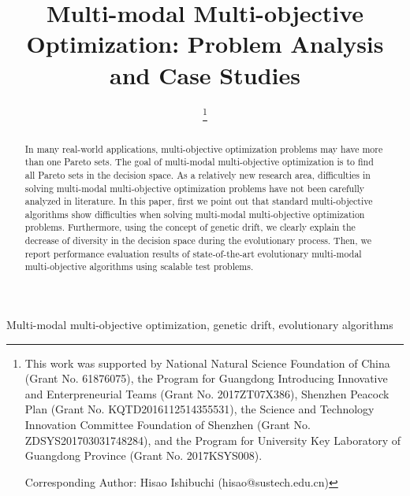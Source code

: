 \documentclass[conference]{IEEEtran}
\begin{document}
\title{Multi-modal Multi-objective Optimization: Problem Analysis and Case Studies
}
\author{
\thanks{This work was supported by National Natural Science Foundation of China (Grant No. 61876075), the Program for Guangdong Introducing Innovative and Enterpreneurial Teams (Grant No. 2017ZT07X386), Shenzhen Peacock Plan (Grant No. KQTD2016112514355531), the Science and Technology Innovation Committee Foundation of Shenzhen (Grant No. ZDSYS201703031748284), and the Program for University Key Laboratory of Guangdong Province (Grant No. 2017KSYS008).

Corresponding Author: Hisao Ishibuchi (hisao@sustech.edu.cn)
}
}

\maketitle

\begin{abstract}
In many real-world applications, multi-objective optimization problems may have more than one Pareto sets. The goal of multi-modal multi-objective optimization is to find all Pareto sets in the decision space. As a relatively new research area, difficulties in solving multi-modal multi-objective optimization problems have not been carefully analyzed in literature. In this paper, first we point out that standard multi-objective algorithms show difficulties when solving multi-modal multi-objective optimization problems. Furthermore, using the concept of genetic drift, we clearly explain the decrease of diversity in the decision space during the evolutionary process. Then, we report performance evaluation results of state-of-the-art evolutionary multi-modal multi-objective algorithms using scalable test problems.
\end{abstract}

\begin{IEEEkeywords}
Multi-modal multi-objective optimization, genetic drift, evolutionary algorithms
\end{IEEEkeywords}
\end{document}
